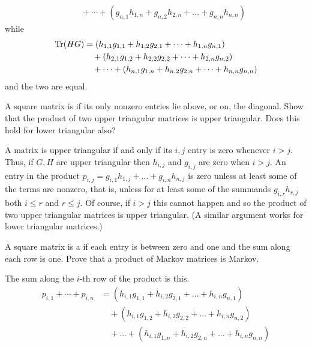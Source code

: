 \begin{exercises}
\begin{answer}
\begin{align*}
       &\text{}\quad
        +\cdots+(g_{n,1}h_{1,n}+g_{n,2}h_{2,n}+\dots+g_{n,n}h_{n,n})
     \end{align*}
     while
     \begin{align*}
       \operatorname{Tr} (HG)
       &=(h_{1,1}g_{1,1}+h_{1,2}g_{2,1}+\dots+h_{1,n}g_{n,1})  \\
       &\text{}\quad+(h_{2,1}g_{1,2}+h_{2,2}g_{2,2}+\dots+h_{2,n}g_{n,2}) \\
       &\text{}\quad
         +\cdots+(h_{n,1}g_{1,n}+h_{n,2}g_{2,n}+\dots+h_{n,n}g_{n,n})
     \end{align*}
     and the two are equal.  
    \end{answer}
  \recommended \item
    A square matrix is 
    if its only nonzero
    entries lie above, or on, the diagonal.
    Show that the product of two upper triangular matrices is upper triangular.
    Does this hold for lower triangular also?
    \begin{answer}
      A matrix is upper triangular if and only if its $i,j$ entry is zero 
      whenever \( i>j \).
      Thus, if \( G,H \) are upper triangular then \( h_{i,j} \) and
      \( g_{i,j} \) are zero when \( i>j \).
      An entry in the product
      \( p_{i,j}=g_{i,1}h_{1,j}+\dots+g_{i,n}h_{n,j} \)
      is zero unless at least some of the terms are nonzero, that is, unless
      for at least some of the summands
      \( g_{i,r}h_{r,j} \) both \( i\leq r \) and \( r\leq j \).
      Of course, if \( i>j \) this cannot happen and so the product of two
      upper triangular matrices is upper triangular.
      (A similar argument works for lower triangular matrices.) 
   \end{answer}
 \item 
   A square matrix is a  
   if each entry is between zero
   and one and the sum along each row is one.
   Prove that a product of Markov matrices is Markov.
   \begin{answer}
     The sum along the \( i \)-th row of the product is this.
     \begin{align*}
       p_{i,1}+\cdots+p_{i,n}
       &=(h_{i,1}g_{1,1}+h_{i,2}g_{2,1}+\dots+h_{i,n}g_{n,1})  \\
       &\text{}\quad+(h_{i,1}g_{1,2}+h_{i,2}g_{2,2}+\dots+h_{i,n}g_{n,2}) \\
       &\text{}\quad
        +\dots+(h_{i,1}g_{1,n}+h_{i,2}g_{2,n}+\dots+h_{i,n}g_{n,n})  \\

\end{align*}
\end{answer}
\end{exercises}
